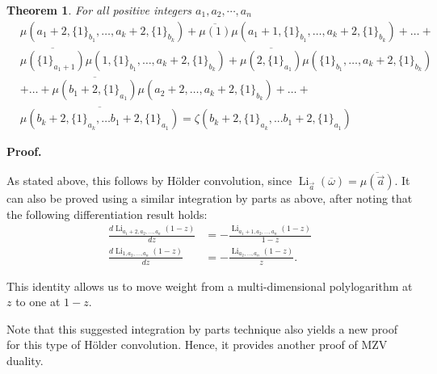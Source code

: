 \documentclass[a4paper,a4paper]{article}
\newtheorem{Thm}{Theorem}
\newcommand{\li}{\operatorname{Li}}
\newcommand{\eop}{\vrule height .9ex width .9ex depth -.1ex}
\begin{document}
\begin{Thm} \label{mcvd2} For all positive integers $a_1, a_2, \cdots, a_n$
\begin{equation}
\begin{split}
\label{eq:mcdu1}
&\mu(a_1 + 2,\{ 1 \}_{b_1}, \dots, a_k + 2, \{ 1 \}_{b_k}) +
\overline{\mu(1)}\mu(a_1 +      1,\{ 1 \}_{b_1}, \dots, a_k + 2, \{ 1
\}_{b_k})       + \dots + \\
&\overline{\mu(\{ 1 \}_{a_1 +   1})}\mu(1,\{ 1 \}_{b_1}, \dots, a_k + 2,
\{ 1 \}_{b_k})
+ \overline{\mu(2, \{ 1 \}_{a_1})}\mu(\{ 1 \}_{b_1}, \dots, a_k + 2,
\{      1 \}_{b_k}) \\
&+ \dots + \overline{\mu(b_1 + 2, \{ 1 \}_{a_1})}\mu(a_2 + 2, \dots, a_k +
2, \{ 1 \}_{b_k}) + \dots + \\
&\overline{\mu(b_k + 2,\{1\}_{a_k}, \dots b_1+2,\{1\}_{a_1})}
= \zeta(b_k + 2,\{1\}_{a_k}, ... b_1+2,\{1\}_{a_1})
\end{split}
\end{equation}
\end{Thm}


{\raggedright \bf Proof.}
As stated above, this follows by  H\"older convolution,
 since $ \li_{\vec{a}}(\overline{\omega}) = \overline{\mu(\vec{a})}$.
 It can also be proved using a similar integration by parts as
  above, after noting that the following differentiation result holds:
\begin{align*}
\frac{d\li_{a_1 + 2, a_2, \dots, a_n}(1-z)}{dz} &
= -\frac{\li_{a_1 + 1,  a_2, \dots, a_n }(1 - z)}{1 - z} \\
\frac{d\li_{1, a_2, \dots, a_n}(1-z)}{dz} &= -\frac{\li_{a_2, \dots, a_n }(1 -
z)}{z}.
\end{align*}

This identity allows us to move weight from a multi-dimensional polylogarithm
at $ z $ to one at $ 1 - z $.
\eop

\vspace{\baselineskip}
Note that this suggested integration by parts
 technique also yields a new proof for this type of H\"older
 convolution.
  Hence, it provides another proof of MZV duality.
\end{document}
